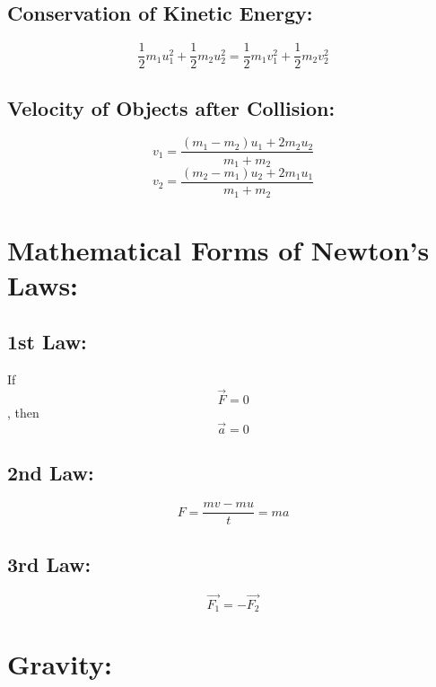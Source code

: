 \documentclass[a4paper]{report}
\begin{document}
        \subsection{Conservation of Kinetic Energy: }
            \begin{equation}
                \frac{1}{2} m_1 u_1^2 + \frac{1}{2} m_2 u_2^2 = \frac{1}{2} m_1 v_1^2 + \frac{1}{2} m_2 v_2^2
            \end{equation}
        \subsection{Velocity of Objects after Collision: }
            \begin{equation}
                v_1 = \frac{(m_1 - m_2)u_1 + 2 m_2 u_2}{m_1 + m_2}
            \end{equation}
            \begin{equation}
                v_2 = \frac{(m_2 - m_1)u_2 + 2 m_1 u_1}{m_1 + m_2}
            \end{equation}
    \section{Mathematical Forms of Newton's Laws: }
        \subsection{1st Law: }
            If
            \begin{equation}
                \vec{F}=0
            \end{equation}
            , then
            \begin{equation}
                \vec{a}=0
            \end{equation}
        \subsection{2nd Law: }
            \begin{equation}
                F = \frac{mv-mu}{t} = ma
            \end{equation}
        \subsection{3rd Law: }
            \begin{equation}
                \vec{F_1} = -\vec{F_2}
            \end{equation}
    \section{Gravity: }
\end{document}
